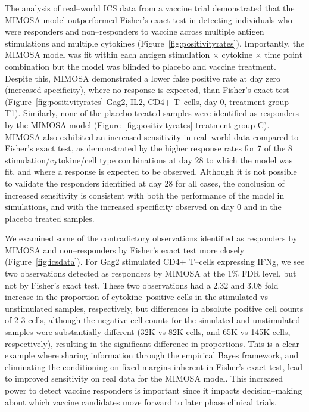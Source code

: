\documentclass[11pt]{article}
\begin{document}
The analysis of real--world ICS data from a vaccine trial demonstrated that the MIMOSA model outperformed Fisher's exact test in detecting individuals who were responders and non--responders to vaccine across multiple antigen stimulations and multiple cytokines (Figure~\ref{fig:positivityrates}). Importantly, the MIMOSA model was fit within each antigen stimulation $\times$ cytokine $\times$ time point combination but the model was blinded to placebo and vaccine treatment. Despite this, MIMOSA demonstrated a lower false positive rate at day zero (increased specificity), where no response is expected, than Fisher's exact test (Figure~\ref{fig:positivityrates} Gag2, IL2, CD4+ T--cells, day 0, treatment group T1). Similarly, none of the placebo treated samples were identified as responders by the MIMOSA model (Figure~\ref{fig:positivityrates} treatment group C). MIMOSA also exhibited an increased sensitivity in real--world data compared to Fisher's exact test, as demonstrated by the higher response rates for 7 of the 8 stimulation/cytokine/cell type combinations at day 28 to which the model was fit, and where a response is expected to be observed. Although it is not possible to validate the responders identified at day 28 for all cases, the conclusion of increased sensitivity is consistent with both the performance of the model in simulations, and with the increased specificity observed on day 0 and in the placebo treated samples. 

We examined some of the contradictory observations identified as responders by MIMOSA and non--responders by Fisher's exact test more closely (Figure~\ref{fig:icsdata}).  For Gag2 stimulated CD4+ T--cells expressing IFNg, we see two observations detected as responders by MIMOSA at the 1\% FDR level, but not by Fisher's exact test. These two observations had a 2.32 and 3.08 fold increase in the proportion of cytokine--positive cells in the stimulated vs unstimulated samples, respectively, but differences in absolute positive cell counts of 2-3 cells, although the negative cell counts for the simulated and unstimulated samples were substantially different (32K vs 82K cells, and 65K vs 145K cells, respectively), resulting in the significant difference in proportions. This is a clear example where sharing information through the empirical Bayes framework, and eliminating the conditioning on fixed margins inherent in Fisher's exact test, lead to improved sensitivity on real data for the MIMOSA model. This increased power to detect vaccine responders is important since it impacts decision--making about which vaccine candidates move forward to later phase clinical trials.
\end{document}

